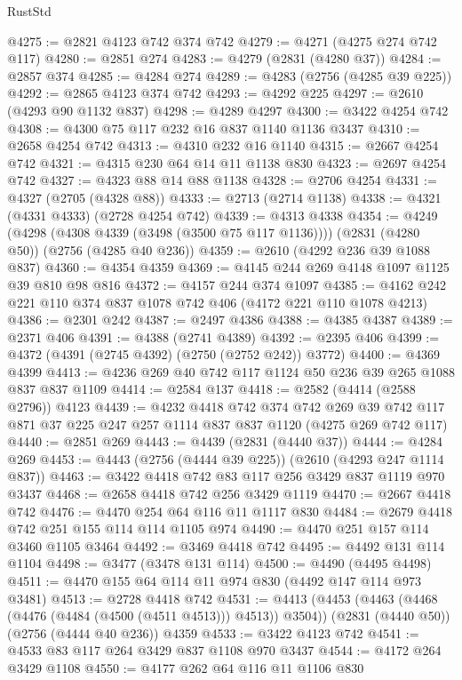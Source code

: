 \begin{lexlean}{RustStd}
\begin{coremodule}
@4275 := @2821 @4123 @742 @374 @742
@4279 := @4271 (@4275 @274 @742 @117)
@4280 := @2851 @274
@4283 := @4279 (@2831 (@4280 @37))
@4284 := @2857 @374
@4285 := @4284 @274
@4289 := @4283 (@2756 (@4285 @39 @225))
@4292 := @2865 @4123 @374 @742
@4293 := @4292 @225
@4297 := @2610 (@4293 @90 @1132 @837)
@4298 := @4289 @4297
@4300 := @3422 @4254 @742
@4308 := @4300 @75 @117 @232 @16 @837 @1140 @1136 @3437
@4310 := @2658 @4254 @742
@4313 := @4310 @232 @16 @1140
@4315 := @2667 @4254 @742
@4321 := @4315 @230 @64 @14 @11 @1138 @830
@4323 := @2697 @4254 @742
@4327 := @4323 @88 @14 @88 @1138
@4328 := @2706 @4254
@4331 := @4327 (@2705 (@4328 @88))
@4333 := @2713 (@2714 @1138)
@4338 := @4321 (@4331 @4333) (@2728 @4254 @742)
@4339 := @4313 @4338
@4354 := @4249
    (@4298 (@4308 @4339 (@3498 (@3500 @75 @117 @1136))))
    (@2831 (@4280 @50))
    (@2756 (@4285 @40 @236))
@4359 := @2610 (@4292 @236 @39 @1088 @837)
@4360 := @4354 @4359
@4369 := @4145 @244 @269 @4148 @1097 @1125 @39 @810 @98 @816
@4372 := @4157 @244 @374 @1097
@4385 := @4162 @242 @221 @110 @374 @837 @1078 @742 @406 (@4172 @221 @110 @1078 @4213)
@4386 := @2301 @242
@4387 := @2497 @4386
@4388 := @4385 @4387
@4389 := @2371 @406
@4391 := @4388 (@2741 @4389)
@4392 := @2395 @406
@4399 := @4372 (@4391 (@2745 @4392) (@2750 (@2752 @242)) @3772)
@4400 := @4369 @4399
@4413 := @4236 @269 @40 @742 @117 @1124 @50 @236 @39 @265 @1088 @837 @837 @1109
@4414 := @2584 @137
@4418 := @2582 (@4414 (@2588 @2796)) @4123
@4439 := @4232
    @4418
    @742
    @374
    @742
    @269
    @39
    @742
    @117
    @871
    @37
    @225
    @247
    @257
    @1114
    @837
    @837
    @1120
    (@4275 @269 @742 @117)
@4440 := @2851 @269
@4443 := @4439 (@2831 (@4440 @37))
@4444 := @4284 @269
@4453 := @4443 (@2756 (@4444 @39 @225)) (@2610 (@4293 @247 @1114 @837))
@4463 := @3422 @4418 @742 @83 @117 @256 @3429 @837 @1119 @970 @3437
@4468 := @2658 @4418 @742 @256 @3429 @1119
@4470 := @2667 @4418 @742
@4476 := @4470 @254 @64 @116 @11 @1117 @830
@4484 := @2679 @4418 @742 @251 @155 @114 @114 @1105 @974
@4490 := @4470 @251 @157 @114 @3460 @1105 @3464
@4492 := @3469 @4418 @742
@4495 := @4492 @131 @114 @1104
@4498 := @3477 (@3478 @131 @114)
@4500 := @4490 (@4495 @4498)
@4511 := @4470 @155 @64 @114 @11 @974 @830 (@4492 @147 @114 @973 @3481)
@4513 := @2728 @4418 @742
@4531 := @4413
    (@4453 (@4463 (@4468 (@4476 (@4484 (@4500 (@4511 @4513))) @4513)) @3504))
    (@2831 (@4440 @50))
    (@2756 (@4444 @40 @236))
    @4359
@4533 := @3422 @4123 @742
@4541 := @4533 @83 @117 @264 @3429 @837 @1108 @970 @3437
@4544 := @4172 @264 @3429 @1108
@4550 := @4177 @262 @64 @116 @11 @1106 @830

\end{coremodule}
\end{lexlean}
